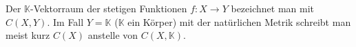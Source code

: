 Der $\mathbb{K}$-Vektorraum der stetigen Funktionen $f : X \to Y$ bezeichnet man mit $C(X, Y)$.
Im Fall $Y = \mathbb{K}$ ($\mathbb{K}$ ein Körper) mit der natürlichen Metrik schreibt man meist kurz $C(X)$ anstelle
von $C(X, \mathbb{K})$.